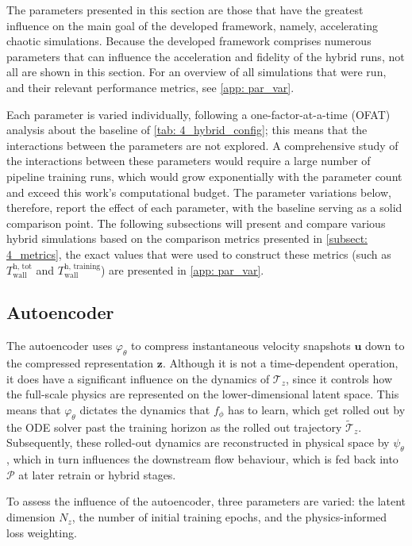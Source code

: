 The parameters presented in this section are those that have the greatest influence on the main goal of the developed framework, namely, accelerating chaotic simulations. Because the developed framework comprises numerous parameters that can influence the acceleration and fidelity of the hybrid runs, not all are shown in this section. For an overview of all simulations that were run, and their relevant performance metrics, see \autoref{app: par_var}.

Each parameter is varied individually, following a one-factor-at-a-time (OFAT) analysis about the baseline of \autoref{tab: 4_hybrid_config}; this means that the interactions between the parameters are not explored. A comprehensive study of the interactions between these parameters would require a large number of pipeline training runs, which would grow exponentially with the parameter count and exceed this work's computational budget. The parameter variations below, therefore, report the effect of each parameter, with the baseline serving as a solid comparison point. The following subsections will present and compare various hybrid simulations based on the comparison metrics presented in \autoref{subsect: 4_metrics}, the exact values that were used to construct these metrics (such as $T^\text{h, tot}_\text{wall}$ and $T^\text{h, training}_\text{wall}$) are presented in \autoref{app: par_var}.


\subsection{Autoencoder}
\label{subsect: 4_ae_parameters}

The autoencoder uses $\varphi_\theta$ to compress instantaneous velocity snapshots $\mathbf{u}$ down to the compressed representation $\mathbf{z}$. Although it is not a time-dependent operation, it does have a significant influence on the dynamics of $\boldsymbol{\mathcal{T}}_z$, since it controls how the full-scale physics are represented on the lower-dimensional latent space. This means that $\varphi_\theta$ dictates the dynamics that $f_\phi$ has to learn, which get rolled out by the ODE solver past the training horizon as the rolled out trajectory $\tilde{\boldsymbol{\mathcal{T}}}_z$. Subsequently, these rolled-out dynamics are reconstructed in physical space by $\psi_\theta$, which in turn influences the downstream flow behaviour, which is fed back into $\mathcal{P}$ at later retrain or hybrid stages. 

To assess the influence of the autoencoder, three parameters are varied: the latent dimension $N_z$, the number of initial training epochs, and the physics-informed loss weighting.

